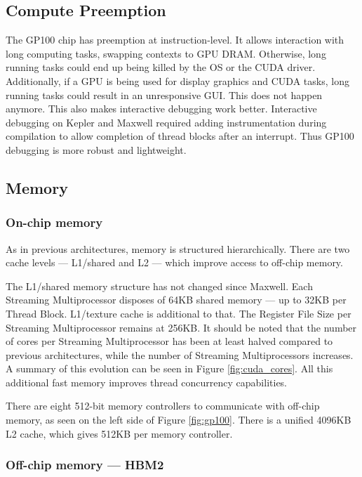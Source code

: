 \subsection{Compute Preemption}
The GP100 chip has preemption at instruction-level.
It allows interaction with long computing tasks, swapping contexts to GPU DRAM.
Otherwise, long running tasks could end up being killed by the OS or the CUDA driver.
Additionally, if a GPU is being used for display graphics and CUDA tasks, long running tasks could result in an unresponsive GUI.
This does not happen anymore.
This also makes interactive debugging work better.
Interactive debugging on Kepler and Maxwell required adding instrumentation during compilation to allow completion of thread blocks after an interrupt.
Thus GP100 debugging is more robust and lightweight.

\subsection{Memory}
\subsubsection{On-chip memory}
As in previous architectures, memory is structured hierarchically.
There are two cache levels --- L1/shared and L2 --- which improve access to off-chip memory.

The L1/shared memory structure has not changed since Maxwell.
Each Streaming Multiprocessor disposes of 64KB shared memory --- up to 32KB per Thread Block.
L1/texture cache is additional to that.
The Register File Size per Streaming Multiprocessor remains at 256KB.
It should be noted that the number of cores per Streaming Multiprocessor has been at least halved compared to previous architectures, while the number of Streaming Multiprocessors increases.
A summary of this evolution can be seen in Figure \ref{fig:cuda_cores}.
All this additional fast memory improves thread concurrency capabilities.

There are eight 512-bit memory controllers to communicate with off-chip memory, as seen on the left side of Figure \ref{fig:gp100}.
There is a unified 4096KB L2 cache, which gives 512KB per memory controller.

\subsubsection{Off-chip memory --- HBM2}

